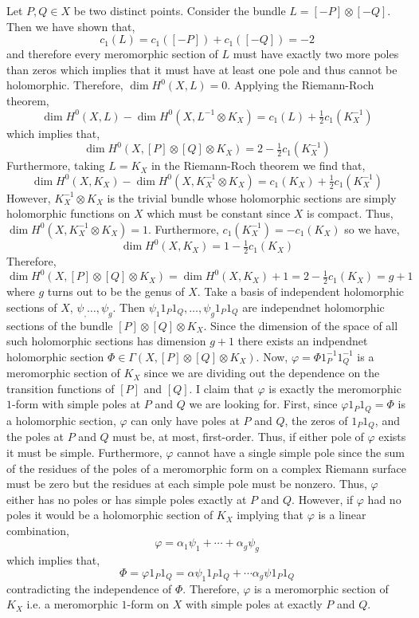 \documentclass[12pt]{extarticle}
\theoremstyle{definition}
\begin{document}
Let $P, Q \in X$ be two distinct points. Consider the bundle $L = [-P] \otimes [-Q]$. Then we have shown that,
\[ c_1(L) = c_1([-P]) + c_1([-Q]) = -2 \]
and therefore every meromorphic section of $L$ must have exactly two more poles than zeros which implies that it must have at least one pole and thus cannot be holomorphic. Therefore, $\dim{H^0(X, L)} = 0$. Applying the Riemann-Roch theorem,
\[ \dim{H^0(X, L)} - \dim{H^0(X, L^{-1} \otimes K_X)} = c_1(L) + \tfrac{1}{2} c_1(K_X^{-1}) \]
which implies that,
\[ \dim{H^0(X, [P] \otimes [Q] \otimes K_X)} = 2 - \tfrac{1}{2} c_1(K_X^{-1}) \] 
Furthermore, taking $L = K_X$ in the Riemann-Roch theorem we find that,
\[ \dim{H^0(X, K_X)} - \dim{H^0(X, K_X^{-1} \otimes K_X)} = c_1(K_X) + \tfrac{1}{2} c_1(K_X^{-1}) \]
However, $K_X^{-1} \otimes K_X$ is the trivial bundle whose holomorphic sections are simply holomorphic functions on $X$ which must be constant since $X$ is compact. Thus, $\dim{H^0(X, K_X^{-1} \otimes K_X)} = 1$. Furthermore, $c_1(K_X^{-1}) = - c_1(K_X)$ so we have,
\[ 
\dim{H^{0}(X, K_X)} = 1 - \tfrac{1}{2} c_1(K_X) \]
Therefore,
\[ \dim{H^0(X, [P] \otimes [Q] \otimes K_X)} = \dim{H^{0}(X, K_X)} + 1 = 2 - \tfrac{1}{2} c_1(K_X) = g + 1
\]
where $g$ turns out to be the genus of $X$. Take a basis of independent holomorphic sections of $X$, $\psi_, \dots, \psi_g$. Then $\psi_1 1_P 1_Q, \dots, \psi_g  1_P 1_Q$ are independnet holomorphic sections of the bundle $[P] \otimes [Q] \otimes K_X$. Since the dimension of the space of all such holomorphic sections has dimension $g + 1$ there exists an indpendnet holomorphic section $\Phi \in \Gamma(X, [P] \otimes [Q] \otimes K_X)$. Now, $\varphi = \Phi 1_P^{-1} 1_Q^{-1}$ is a meromorphic section of $K_X$ since we are dividing out the dependence on the transition functions of $[P]$ and $[Q]$. I claim that $\varphi$ is exactly the meromorphic $1$-form with simple poles at $P$ and $Q$ we are looking for. First, since $\varphi 1_P 1_Q = \Phi$ is a holomorphic section, $\varphi$ can only have poles at $P$ and $Q$, the zeros of $1_P 1_Q$, and the poles at $P$ and $Q$ must be, at most, first-order. Thus, if either pole of $\varphi$ exists it must be simple. Furthermore, $\varphi$ cannot have a single simple pole since the sum of the residues of the poles of a meromorphic form on a complex Riemann surface must be zero but the residues at each simple pole must be nonzero. Thus, $\varphi$ either has no poles or has simple poles exactly at $P$ and $Q$. However, if $\varphi$ had no poles it would be a holomorphic section of $K_X$ implying that $\varphi$ is a linear combination,
\[ \varphi = \alpha_1 \psi_1 + \cdots + \alpha_g \psi_g \]
which implies that,
\[ \Phi = \varphi 1_P 1_Q = \alpha \psi_1 1_P 1_Q + \cdots \alpha_g \psi 1_P 1_Q \]
contradicting the independence of $\Phi$. Therefore, $\varphi$ is a meromorphic section of $K_X$ i.e. a meromorphic $1$-form on $X$ with simple poles at exactly $P$ and $Q$. 
\end{document}
